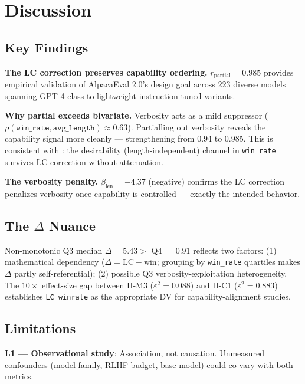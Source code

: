 \section{Discussion}
\label{sec:discussion}

\subsection{Key Findings}

\textbf{The LC correction preserves capability ordering.} $r_{\mathrm{partial}} = 0.985$
provides empirical validation of AlpacaEval 2.0's design goal across 223 diverse models
spanning GPT-4 class to lightweight instruction-tuned variants.

\textbf{Why partial exceeds bivariate.} Verbosity acts as a mild suppressor
($\rho(\texttt{win\_rate}, \texttt{avg\_length}) \approx 0.63$). Partialling out verbosity
reveals the capability signal more cleanly --- strengthening from 0.94 to 0.985. This is
consistent with \citet{Hu2024Explaining}: the desirability (length-independent) channel in
\texttt{win\_rate} survives LC correction without attenuation.

\textbf{The verbosity penalty.} $\beta_{\mathrm{len}} = -4.37$ (negative) confirms the LC
correction penalizes verbosity once capability is controlled --- exactly the intended behavior.

\subsection{The $\Delta$ Nuance}

Non-monotonic Q3 median $\Delta = 5.43 >$ Q4 $= 0.91$ reflects two factors:
(1) mathematical dependency ($\Delta = \text{LC} - \text{win}$; grouping by \texttt{win\_rate}
quartiles makes $\Delta$ partly self-referential); (2) possible Q3 verbosity-exploitation
heterogeneity. The $10\times$ effect-size gap between H-M3 ($\varepsilon^2 = 0.088$) and H-C1
($\varepsilon^2 = 0.883$) establishes \texttt{LC\_winrate} as the appropriate DV for
capability-alignment studies.

\subsection{Limitations}

\textbf{L1 --- Observational study}: Association, not causation. Unmeasured confounders (model
family, RLHF budget, base model) could co-vary with both metrics.

